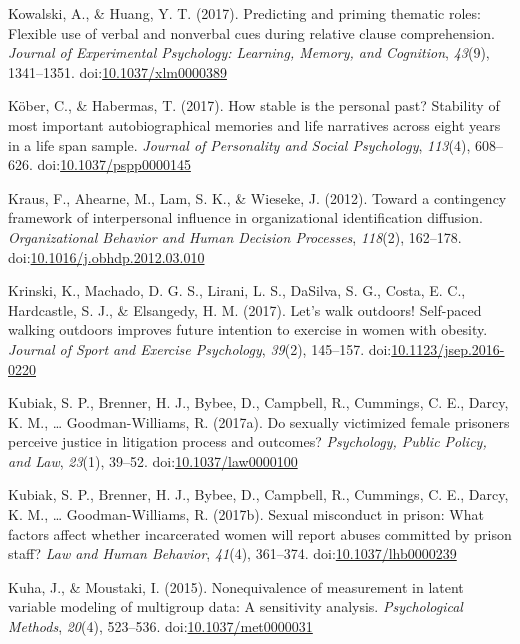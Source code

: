 \documentclass[english,man]{apa6}
\begin{document}
\hypertarget{ref-Kowalski2017}{}
Kowalski, A., \& Huang, Y. T. (2017). Predicting and priming thematic
roles: Flexible use of verbal and nonverbal cues during relative clause
comprehension. \emph{Journal of Experimental Psychology: Learning,
Memory, and Cognition}, \emph{43}(9), 1341--1351.
doi:\href{https://doi.org/10.1037/xlm0000389}{10.1037/xlm0000389}

\hypertarget{ref-Kober2017}{}
Köber, C., \& Habermas, T. (2017). How stable is the personal past?
Stability of most important autobiographical memories and life
narratives across eight years in a life span sample. \emph{Journal of
Personality and Social Psychology}, \emph{113}(4), 608--626.
doi:\href{https://doi.org/10.1037/pspp0000145}{10.1037/pspp0000145}

\hypertarget{ref-Kraus2012}{}
Kraus, F., Ahearne, M., Lam, S. K., \& Wieseke, J. (2012). Toward a
contingency framework of interpersonal influence in organizational
identification diffusion. \emph{Organizational Behavior and Human
Decision Processes}, \emph{118}(2), 162--178.
doi:\href{https://doi.org/10.1016/j.obhdp.2012.03.010}{10.1016/j.obhdp.2012.03.010}

\hypertarget{ref-Krinski2017}{}
Krinski, K., Machado, D. G. S., Lirani, L. S., DaSilva, S. G., Costa, E.
C., Hardcastle, S. J., \& Elsangedy, H. M. (2017). Let's walk outdoors!
Self-paced walking outdoors improves future intention to exercise in
women with obesity. \emph{Journal of Sport and Exercise Psychology},
\emph{39}(2), 145--157.
doi:\href{https://doi.org/10.1123/jsep.2016-0220}{10.1123/jsep.2016-0220}

\hypertarget{ref-Kubiak2017a}{}
Kubiak, S. P., Brenner, H. J., Bybee, D., Campbell, R., Cummings, C. E.,
Darcy, K. M., \ldots{} Goodman-Williams, R. (2017a). Do sexually
victimized female prisoners perceive justice in litigation process and
outcomes? \emph{Psychology, Public Policy, and Law}, \emph{23}(1),
39--52.
doi:\href{https://doi.org/10.1037/law0000100}{10.1037/law0000100}

\hypertarget{ref-Kubiak2017}{}
Kubiak, S. P., Brenner, H. J., Bybee, D., Campbell, R., Cummings, C. E.,
Darcy, K. M., \ldots{} Goodman-Williams, R. (2017b). Sexual misconduct
in prison: What factors affect whether incarcerated women will report
abuses committed by prison staff? \emph{Law and Human Behavior},
\emph{41}(4), 361--374.
doi:\href{https://doi.org/10.1037/lhb0000239}{10.1037/lhb0000239}

\hypertarget{ref-Kuha2015}{}
Kuha, J., \& Moustaki, I. (2015). Nonequivalence of measurement in
latent variable modeling of multigroup data: A sensitivity analysis.
\emph{Psychological Methods}, \emph{20}(4), 523--536.
doi:\href{https://doi.org/10.1037/met0000031}{10.1037/met0000031}
\end{document}
